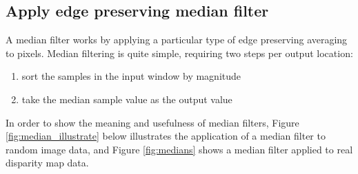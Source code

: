 \documentclass[11pt,fleqn]{article}
\begin{document}
\subsection{Apply edge preserving median filter}

A median filter works by applying a particular type of edge preserving averaging to pixels. Median filtering is quite simple, requiring two steps per output location:

\begin{enumerate}
\item sort the samples in the input window by magnitude
\item take the median sample value as the output value
\end{enumerate}
%
In order to show the meaning and usefulness of median filters, Figure \ref{fig:median_illustrate} below illustrates the application of a median filter to random image data, and Figure \ref{fig:medians} shows a median filter applied to real disparity map data.
\end{document}
